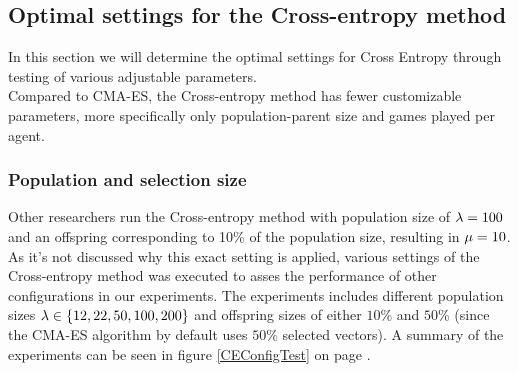 \subsection{Optimal settings 
for the Cross-entropy method \label{optimalsettingsce}}

In this section we will determine the optimal settings for Cross Entropy through testing
of various adjustable parameters.\\
Compared to CMA-ES, the Cross-entropy method has fewer customizable parameters, more specifically 
only population-parent size and games played per agent.

\subsubsection{Population and selection size}
Other researchers run the Cross-entropy method with population size of
$\lambda = 100$ and an offspring corresponding to 10\% of 
the population size, resulting in $\mu = 10$. As it's not 
discussed why this exact setting is applied, various settings of the Cross-entropy method
was executed to asses the performance of other configurations
in our experiments.
The experiments includes different population sizes 
$\lambda \in \{12, 22, 50, 100, 200\}$ and offspring 
sizes of either $10\%$ and $50\%$ (since the CMA-ES algorithm by default
uses $50 \%$ selected vectors). 
A summary of the experiments can be seen in figure \ref{CEConfigTest}
on page \pageref{CEConfigTest}.


